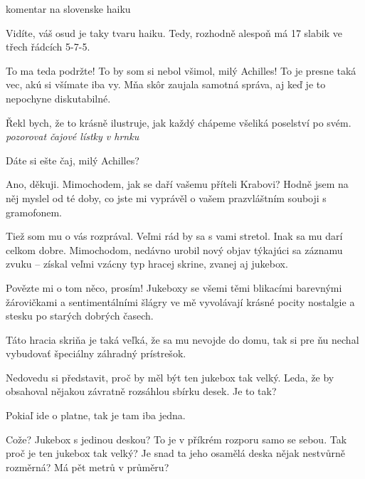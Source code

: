 \documentclass[12pt]{article}
\begin{document}
\begin{description}[itemsep=0pt]
\item[TODO] komentar na slovenske haiku

\item[A:] Vidíte, váš osud je taky tvaru haiku. Tedy, rozhodně alespoň má
    17 slabik ve třech řádcích 5-7-5.

\item[Ž:] To ma teda podržte! To by som si nebol všimol, milý Achilles! To je presne 
    taká vec, akú si všímate iba vy. Mňa skôr zaujala samotná správa, aj keď je 
    to nepochyne diskutabilné.

\item[A:] Řekl bych, že to krásně ilustruje, jak každý chápeme všeliká poselství
    po svém. \textit{pozorovat čajové lístky v hrnku}

\item[ž:] Dáte si ešte čaj, milý Achilles?

\item[A:] Ano, děkuji. Mimochodem, jak se daří vašemu příteli Krabovi? Hodně jsem na něj
    myslel od té doby, co jste mi vyprávěl o vašem prazvláštním souboji s gramofonem.

\item[Ž:] Tiež som mu o vás rozprával. Veľmi rád by sa s vami stretol. Inak sa mu darí 
    celkom dobre. Mimochodom, nedávno urobil nový objav týkajúci sa záznamu zvuku -- získal 
    veľmi vzácny typ hracej skrine, zvanej aj jukebox.

\item[A:] Povězte mi o tom něco, prosím! Jukeboxy se všemi těmi blikacími barevnými
    žárovičkami a sentimentálními šlágry ve mě vyvolávají krásné pocity nostalgie
    a stesku po starých dobrých časech.

\item[Ž:] Táto hracia skriňa je taká veľká, že sa mu nevojde do domu, tak si pre ňu 
    nechal vybudovať špeciálny záhradný prístrešok. 

\item[A:] Nedovedu si představit, proč by měl být ten jukebox tak velký.
    Leda, že by obsahoval nějakou závratně rozsáhlou sbírku desek. Je to tak?

\item[Ž:] Pokiaľ ide o platne, tak je tam iba jedna.

\item[A:] Cože? Jukebox s jedinou deskou? To je v příkrém rozporu samo se sebou.
    Tak proč je ten jukebox tak velký? Je snad ta jeho osamělá deska nějak
    nestvůrně rozměrná? Má pět metrů v průměru?


\end{description}
\end{document}
